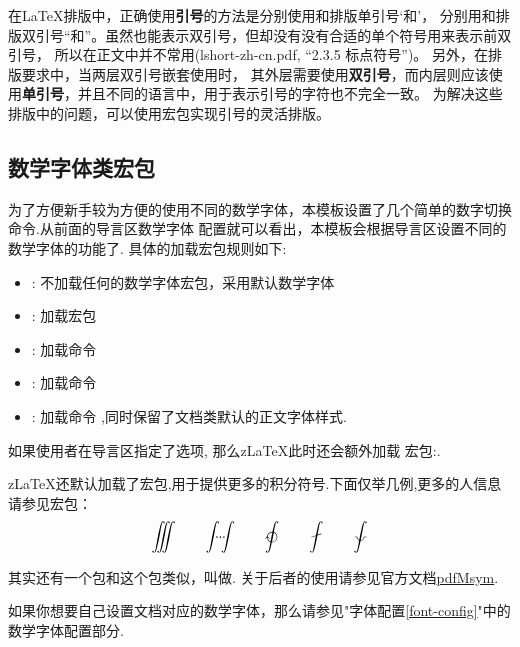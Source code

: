 在\LaTeX{}排版中，正确使用{\bf 引号}的方法是分别使用和\cmd{\'}排版单引号`和'，
分别用和\cmd{\'\'}排版双引号``和''。虽然也能表示双引号，但却没有没有合适的单个符号用来表示前双引号，
所以在正文中并不常用(lshort-zh-cn.pdf, “2.3.5 标点符号”)。 另外，在排版要求中，当两层双引号嵌套使用时，
其外层需要使用{\bf 双引号}，而内层则应该使用{\bf 单引号}，并且不同的语言中，用于表示引号的字符也不完全一致。
为解决这些排版中的问题，可以使用宏包实现引号的灵活排版。

\subsection{数学字体类宏包}
为了方便新手较为方便的使用不同的数学字体，本模板设置了几个简单的数字切换命令.从前面的导言区数学字体
配置就可以看出，本模板会根据导言区设置不同的数学字体的功能了. 具体的加载宏包规则如下:
\begin{itemize}
    \item {}: 不加载任何的数学字体宏包，采用默认数学字体
    \item {}: 加载宏包 
    \item {}: 加载命令 
    \item {}: 加载命令 \par
    \item {}: 加载命令 \cmd{\RequirePackage{mathpazo}},同时保留了文档类默认的正文字体样式.
\end{itemize}

如果使用者在导言区指定了选项, 那么z\LaTeX{}此时还会额外加载
宏包:.

z\LaTeX{}还默认加载了宏包,用于提供更多的积分符号.下面仅举几例,更多的人信息请参见宏包：
\[
    \iiint\qquad 
    \idotsint\qquad
    \ointclockwise\qquad
    \fint\qquad
    \landdownint
\]

其实还有一个包和这个包类似，叫做. 关于后者的使用请参见官方文档\href{https://mirror-hk.koddos.net/CTAN/macros/generic/pdfmsym/pdfmsym-doc.pdf}{pdfMsym}.

\begin{leftbar}
如果你想要自己设置文档对应的数学字体，那么请参见"字体配置\cref{font-config}"中的数学字体配置部分.
\end{leftbar}

